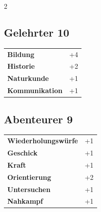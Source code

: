 \begin{multicols}{2}
\begin{tcolorbox}
\end{tcolorbox}

\begin{tcolorbox}
    \subsection*{Gelehrter \hfill \small{10 }}
    \tcblower




\begin{tabular}{@{}ll@{}}
    \textbf{Bildung} & +4\\
    \textbf{Historie} & +2\\
    \textbf{Naturkunde} & +1\\
    \textbf{Kommunikation} & +1\\
\end{tabular}


\end{tcolorbox}

\begin{tcolorbox}
    \subsection*{Abenteurer \hfill \small{9 }}
    \tcblower




\begin{tabular}{@{}ll@{}}
    \textbf{Wiederholungswürfe} & +1\\
    \textbf{Geschick} & +1\\
    \textbf{Kraft} & +1\\
    \textbf{Orientierung} & +2\\
    \textbf{Untersuchen} & +1\\
    \textbf{Nahkampf} & +1\\
\end{tabular}


\end{tcolorbox}

\begin{tcolorbox}

\end{tcolorbox}
\end{multicols}
